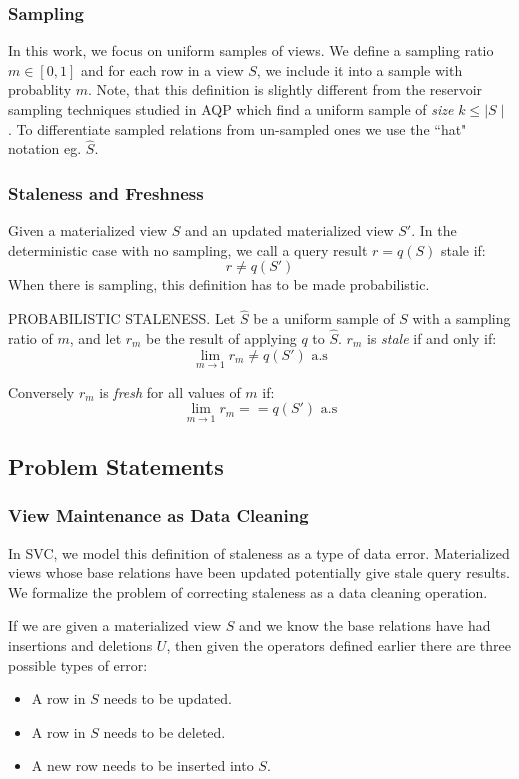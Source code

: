 \subsubsection{Sampling}
In this work, we focus on uniform samples of views.
We define a sampling ratio $m\in [0,1]$ and for each row in a view $S$, we include it into a sample with probablity $m$.
Note, that this definition is slightly different from the reservoir sampling techniques studied in AQP which find a uniform
sample of \emph{size} $k\le \mid S \mid$.
To differentiate sampled relations from un-sampled ones we use the ``hat" notation eg. $\hat{S}$.

\subsubsection{Staleness and Freshness}
Given a materialized view $S$ and an updated materialized view $S'$.
In the deterministic case with no sampling, we call a query result $r = q(S)$ stale if:
\[r \ne q(S')\]
When there is sampling, this definition has to be made probabilistic.
\begin{definition} PROBABILISTIC STALENESS.
Let $\hat{S}$ be a uniform sample of $S$ with a sampling ratio of $m$,
and let $r_m$ be the result of applying $q$ to $\hat{S}$.
$r_m$ is \emph{stale} if and only if:
\[\lim_{m\rightarrow 1} r_m \ne q(S') \text{  a.s}\]

Conversely $r_m$ is \emph{fresh} for all values of $m$ if:
\[\lim_{m\rightarrow 1} r_m == q(S') \text{  a.s}\]
\end{definition}

\subsection{Problem Statements}
\subsubsection{View Maintenance as Data Cleaning}
In SVC, we model this definition of staleness as a type of data error.
Materialized views whose base relations have been updated potentially give stale query results.
We formalize the problem of correcting staleness as a data cleaning operation.

If we are given a materialized view $S$ and we know the base relations have had insertions and deletions $U$, then given the operators defined earlier there are three possible types of error:
\begin{itemize}
\item A row in $S$ needs to be updated.
\item A row in $S$ needs to be deleted.
\item A new row needs to be inserted into $S$.
\end{itemize}

